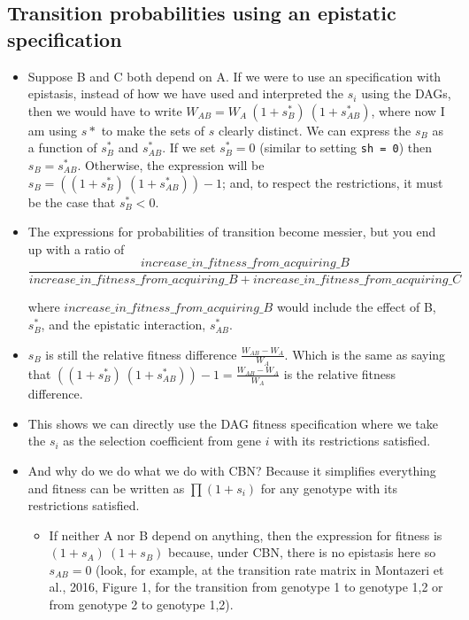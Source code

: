 \documentclass[11pt]{article}
\begin{document}
\subsection{Transition probabilities using an epistatic specification}
\label{sec:orge68f649}
\begin{itemize}
\item Suppose B and C both depend on A. If we were to use an specification with epistasis, instead of how we have used and interpreted the \(s_i\) using the DAGs, then we would have to write \(W_{AB} = W_A \ (1 + s_B^*) \ (1 + s_{AB}^*)\), where now I am using \(s*\) to make the sets of \(s\) clearly distinct. We can express the \(s_B\) as a function of \(s_B^*\) and \(s_{AB}^*\). If we set \(s_B^* = 0\) (similar to setting \texttt{sh = 0}) then \(s_B = s_{AB}^*\). Otherwise, the expression will be \(s_B = ((1 + s_B^*)\ (1 + s_{AB}^*)) - 1\); and, to respect the restrictions, it must be the case that \(s_B^* < 0\).

\item The expressions for probabilities of transition become messier, but you end up with a ratio of \\
\[ \frac{increase\_in\_fitness\_from\_acquiring\_B}{increase\_in\_fitness\_from\_acquiring\_B + increase\_in\_fitness\_from\_acquiring\_C} \]

where \(increase\_in\_fitness\_from\_acquiring\_B\) would include the effect of B, \(s_B^*\), and the epistatic interaction, \(s_{AB}^*\).

\item \(s_B\) is still the relative fitness difference \(\frac{W_{AB} - W_A}{W_A}\). Which is the same as saying that \(((1 + s_B^*)\ (1 + s_{AB}^*)) - 1 = \frac{W_{AB} - W_A}{W_A}\) is the relative fitness difference.

\item This shows we can directly use the DAG fitness specification where we take the \(s_i\) as the selection coefficient from gene \(i\) with its restrictions satisfied.

\item And why do we do what we do with CBN? Because it simplifies everything and fitness can be written as \(\prod (1 + s_i)\) for any genotype with its restrictions satisfied.
  \begin{itemize}

\item If neither A nor B depend on anything, then the expression for fitness is \((1 + s_A)\ (1 + s_B)\) because, under CBN, there is no epistasis here so \(s_{AB} = 0\) (look, for example, at the transition rate matrix in Montazeri et al., 2016, Figure 1, for the transition from genotype 1 to genotype 1,2 or from genotype 2 to genotype 1,2). 


\end{itemize}
\end{itemize}
\end{document}
